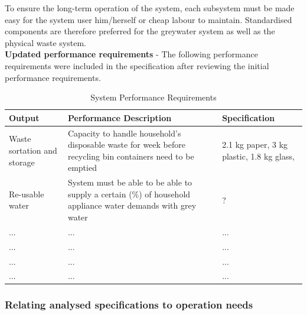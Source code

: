 \documentclass[a4paper,11pt,fleqn]{report}
\begin{document}
To ensure the long-term operation of the system, each subsystem must be made easy for the system user him/herself or cheap labour to maintain. Standardised components are therefore preferred for the greywater system as well as the physical waste system. \\

\noindent\textbf{Updated performance requirements} -
The following performance requirements were included in the specification after reviewing the initial performance requirements.
%
\begin{table}[h!]
\caption {System Performance Requirements} \label{tb: Functional_SS_elements} 
\begin{center}
\begin{tabular}{p{3cm}|p{6cm}|p{5.5cm}}\toprule
	{\textbf{Output}} & {\textbf{Performance Description}} & {\textbf{Specification}}\\ \midrule
    \hline
   Waste sortation and storage & Capacity to handle household's disposable waste for week before recycling bin containers need to be emptied  & 2.1 kg paper, 3 kg plastic, 1.8 kg glass, \citep{Sithole2014}\\
        \hline
    Re-usable water & System must be able to be able to supply a certain (\%) of household appliance water demands with grey water & ?\\
        \hline
    ... & ... & ...\\
        \hline
    ... & ... & ...\\
        \hline
    ... & ... & ...\\
        \hline
    ... & ... & ...\\

    \bottomrule
\end{tabular}
\end{center}
\end{table}
%

\subsubsection{Relating analysed specifications to operation needs}
\end{document}
